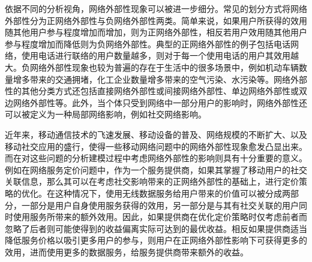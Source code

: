 依据不同的分析视角，网络外部性现象可以被进一步细分。常见的划分方式将网络外部性分为正网络外部性与负网络外部性两类。简单来说，如果用户所获得的效用随其他用户参与程度增加而增加，则为正网络外部性，相反若用户效用随其他用户参与程度增加而降低则为负网络外部性。典型的正网络外部性的例子包括电话网络，使用电话进行联络的用户数量越多，则对于每一个使用电话的用户其效用越大。负网络外部性现象\cite{negative}也较为普遍的存在于生活中的很多场景中，例如机动车辆数量增多带来的交通拥堵，化工企业数量增多带来的空气污染、水污染等。网络外部性的其他分类方式还包括直接网络外部性或间接网络外部性、单边网络外部性或双边网络外部性等。此外，当个体只受到网络中一部分用户的影响时，网络外部性还可以被定义为一种{\kaishu 局部网络影响}，例如社交网络影响\cite{jianweibook}。



近年来，移动通信技术的飞速发展、移动设备的普及、网络规模的不断扩大、以及移动社交应用的盛行，使得一些移动网络问题中的网络外部性现象愈发凸显出来。而在对这些问题的分析建模过程中考虑网络外部性的影响则具有十分重要的意义。
例如在网络服务定价问题中，作为一个服务提供商，如果其掌握了移动用户的社交关联信息，那么其可以在考虑社交影响带来的正网络外部性的基础上，进行定价策略的优化。在这种情况下，使用无线数据服务给用户带来的价值可以被分成两部分，一部分是用户自身使用服务获得的效用，另一部分是与其有社交关联的用户同时使用服务所带来的额外效用。因此，如果提供商在优化定价策略时仅考虑前者而忽略了后者则可能使得到的收益偏离实际可达到的最优收益。相反如果提供商适当降低服务价格以吸引更多用户的参与，则用户在正网络外部性影响下可获得更多的效用，进而使用更多的数据服务，给服务提供商带来额外的收益。

